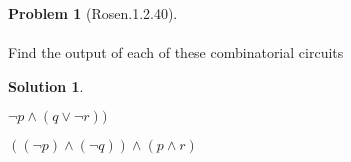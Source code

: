 \documentclass{article}
\theoremstyle{definition}
\newtheorem*{problem}{Problem}
\newtheorem*{solution}{Solution}
\begin{document}
\begin{problem}[Rosen.1.2.40]\ \\
\ \\
Find the output of each of these combinatorial circuits\ \\
\begin{compactenum}
\renewcommand{\theenumi}{\alph{enumi}}
\item
\item
\end{compactenum}
\end{problem}

\begin{solution}\ \\

\begin{compactenum}
\renewcommand{\theenumi}{\alph{enumi}}  
\item $\neg p \wedge (q \vee \neg r))$
\item $((\neg p) \wedge (\neg q)) \wedge (p \wedge r) $





\end{compactenum}
\end{solution}
\end{document}
